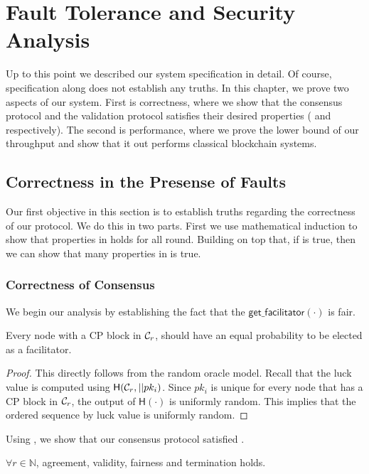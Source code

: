 \chapter{Fault Tolerance and Security Analysis}
\label{ch:analysis}

Up to this point we described our system specification in detail.
Of course, specification along does not establish any truths.
In this chapter, we prove two aspects of our system.
First is correctness,
where we show that the consensus protocol and the validation protocol satisfies their desired properties
( and  respectively).
The second is performance,
where we prove the lower bound of our throughput and show that it out performs classical blockchain systems.

\section{Correctness in the Presense of Faults}
Our first objective in this section is to establish truths regarding the correctness of our protocol.
We do this in two parts.
First we use mathematical induction to show that properties in  holds for all round.
Building on top that, if  is true, then we can show that many properties in  is true.


\subsection{Correctness of Consensus}

We begin our analysis by establishing the fact that the $\textsf{get\_facilitator}(\cdot)$ is fair.
\begin{lemma}
\label{lemma:fairness}
Every node with a CP block in $\mathcal{C}_r$, should have an equal probability to be elected as a facilitator.
\end{lemma}
\begin{proof}
This directly follows from the random oracle model.
Recall that the luck value is computed using $\textsf{H}(\mathcal{C}_r, || pk_i)$.
Since $pk_i$ is unique for every node that has a CP block in $\mathcal{C}_r$, the output of $\textsf{H}(\cdot)$ is uniformly random.
This implies that the ordered sequence by luck value is uniformly random.
\end{proof}


Using , we show that our consensus protocol satisfied .
\begin{lemma}
\label{lemma:consensus}
$\forall r \in \mathbb{N}$, agreement, validity, fairness and termination holds.
\end{lemma}

